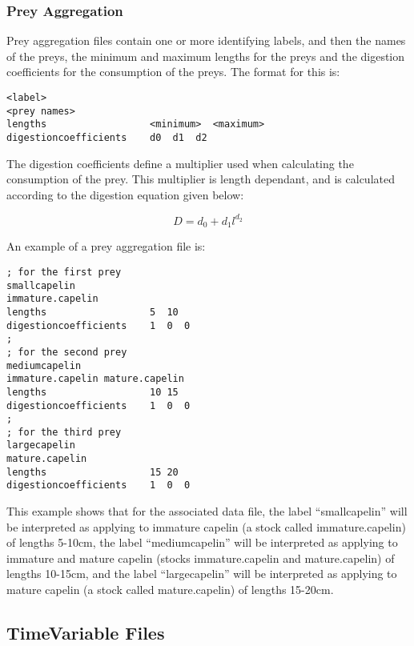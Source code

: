 \documentclass[]{book}
\begin{document}
\hypertarget{subsec:preyagg}{%
\subsubsection{Prey Aggregation}\label{subsec:preyagg}}

Prey aggregation files contain one or more identifying labels, and then
the names of the preys, the minimum and maximum lengths for the preys
and the digestion coefficients for the consumption of the preys. The
format for this is:

\begin{verbatim}
<label>
<prey names>
lengths                  <minimum>  <maximum>
digestioncoefficients    d0  d1  d2
\end{verbatim}

The digestion coefficients define a multiplier used when calculating the
consumption of the prey. This multiplier is length dependant, and is
calculated according to the digestion equation given below:

\begin{equation}
\label{eq:digestion}
D = d_{0} + d_{1}l^{d_{2}}\end{equation}

An example of a prey aggregation file is:

\begin{verbatim}
; for the first prey
smallcapelin
immature.capelin
lengths                  5  10
digestioncoefficients    1  0  0
;
; for the second prey
mediumcapelin
immature.capelin mature.capelin
lengths                  10 15
digestioncoefficients    1  0  0
;
; for the third prey
largecapelin
mature.capelin
lengths                  15 20
digestioncoefficients    1  0  0
\end{verbatim}

This example shows that for the associated data file, the label
``smallcapelin'' will be interpreted as applying to immature capelin (a
stock called immature.capelin) of lengths 5-10cm, the label
``mediumcapelin'' will be interpreted as applying to immature and mature
capelin (stocks immature.capelin and mature.capelin) of lengths 10-15cm,
and the label ``largecapelin'' will be interpreted as applying to mature
capelin (a stock called mature.capelin) of lengths 15-20cm.

\hypertarget{subsec:timevar}{%
\subsection{TimeVariable Files}\label{subsec:timevar}}
\end{document}
